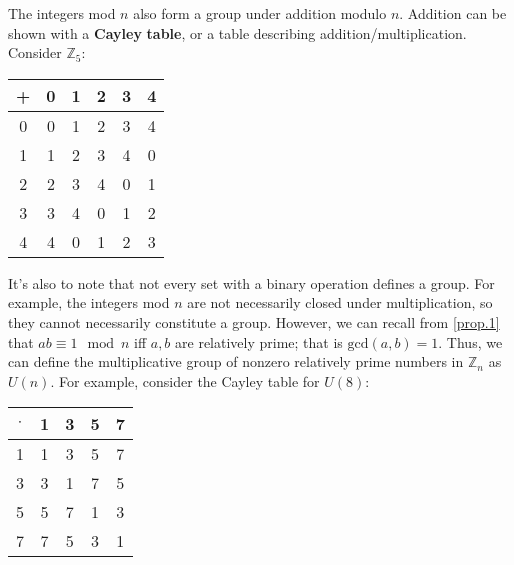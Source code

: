 \documentclass[12pt, letterpaper]{report}
\begin{document}
The integers mod \(n\) also form a group under addition modulo \(n\). Addition can be shown with a \textbf{Cayley} \textbf{table}, or a table describing addition/multiplication. Consider \(\mathbb{Z} _5\):\\
\begin{center}\begin{tabular}{c|ccccc}
	+&0&1&2&3&4\\
	\hline
	0&0&1&2&3&4\\
	1&1&2&3&4&0\\
	2&2&3&4&0&1\\
	3&3&4&0&1&2\\
	4&4&0&1&2&3
\end{tabular}\end{center}
It's also to note that not every set with a binary operation defines a group. For example, the integers mod \(n\) are not necessarily closed under multiplication, so they cannot necessarily constitute a group. However, we can recall from \ref{prop.1} that \(ab\equiv 1\mod n\) iff \(a,b\) are relatively prime; that is \(\text{gcd}(a,b)=1 \). Thus, we can define the multiplicative group of nonzero relatively prime numbers in \(\mathbb{Z} _n\) as \(U(n)\). For example, consider the Cayley table for \(U(8)\):\\
\begin{center}
	\begin{tabular}{c|cccc}
		\(\cdot\)&1&3&5&7\\
		\hline
		1&1&3&5&7\\
		3&3&1&7&5\\
		5&5&7&1&3\\
		7&7&5&3&1\\ 
	\end{tabular}
\end{center}
\end{document}
